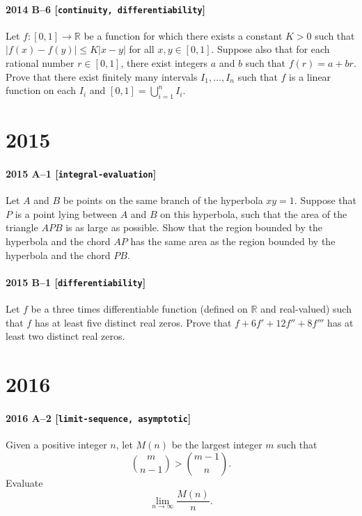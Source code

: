 \documentclass[11pt]{article}
\begin{document}
\paragraph{2014 B--6 \textnormal{[\texttt{continuity, differentiability}]}}
Let $f: [0,1] \to \mathbb{R}$ be a function for which there exists a constant $K>0$
such that $\left| f(x) - f(y) \right| \leq K \left| x - y \right|$ for all $x,y \in [0,1]$.
Suppose also that for each rational number $r \in [0,1]$, there exist integers $a$ and $b$
such that $f(r) = a + br$. Prove that there exist finitely many intervals $I_1, \dots, I_n$
such that $f$ is a linear function on each $I_i$ and $[0,1] = \bigcup_{i=1}^n I_i$.

\section*{2015}

\paragraph{2015 A--1 \textnormal{[\texttt{integral-evaluation}]}}
Let $A$ and $B$ be points on the same branch of the hyperbola $xy=1$. Suppose that $P$ is a point lying between $A$ and $B$ on this hyperbola, such that the area of the triangle $APB$ is as large as possible. Show that the region bounded by the hyperbola and the chord $AP$ has the same area as the region bounded by the hyperbola and the chord $PB$.

\paragraph{2015 B--1 \textnormal{[\texttt{differentiability}]}}
Let $f$ be a three times differentiable function (defined on $\mathbb{R}$ and real-valued) such that $f$ has at least five distinct real zeros. Prove that $f + 6f' + 12f'' + 8f'''$ has at least two distinct real zeros.

\section*{2016}

\paragraph{2016 A--2 \textnormal{[\texttt{limit-sequence, asymptotic}]}}
Given a positive integer $n$, let $M(n)$ be the largest integer $m$ such that
\[
\binom{m}{n-1} > \binom{m-1}{n}.
\]
Evaluate
\[
\lim_{n \to \infty} \frac{M(n)}{n}.
\]
\end{document}
